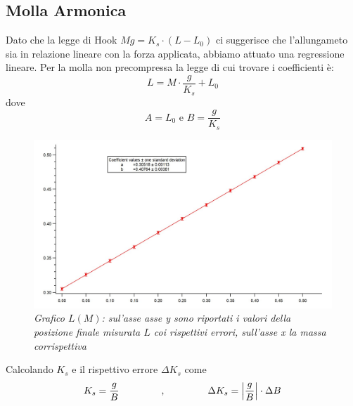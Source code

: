 \documentclass[12pt, a4paper]{article}
\begin{document}
\subsection{Molla Armonica}
Dato che la legge di Hook $Mg=K_s\cdot(L-L_0)$ ci suggerisce che l'allungameto sia in relazione lineare con la forza applicata, abbiamo attuato una regressione lineare. 
Per la molla non precompressa la legge di cui trovare i coefficienti è: \begin{equation*}
    L=M\cdot\displaystyle\frac{g}{K_s}+L_0
\end{equation*} 
dove\\ 
\begin{equation*}
 A= L_0 \text{ e } B=\displaystyle\frac{g}{K_s}   
\end{equation*}



    \begin{figure}[h]

\includegraphics[width=170mm]{./immagini/Graph Molla Arm Stat.jpg}
\centering
\caption{\textit{{\footnotesize{Grafico $L(M)$}: sul'asse asse \textit{y} sono riportati i valori della posizione finale misurata $L$ coi rispettivi errori, sull'asse \textit{x} la massa corrispettiva}}}
\label{Grafico parabolico}
\end{figure}

\bigskip
\bigskip

Calcolando $K_s$ e il rispettivo errore $\Delta K_s$ come\\

\begin{equation*}
\centering
    K_s= \frac{g}{B} \text{\phantom{Testo invi}} \text{,} \text{\phantom{Testo sibil}} \Delta K_s = \left | \frac{g}{B}  \right | \cdot \Delta B 
\end{equation*}
\bigskip
\end{document}
